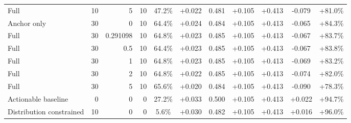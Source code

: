 \begin{table}[htbp]
\begin{tabular}{lrrrccccccc}
Full & 10 & 5 & 10 & 47.2\% & +0.022 & 0.481 & +0.105 & +0.413 & -0.079 & +81.0\% \\
Anchor only & 30 & 0 & 10 & 64.4\% & +0.024 & 0.484 & +0.105 & +0.413 & -0.065 & +84.3\% \\
Full & 30 & 0.291098 & 10 & 64.8\% & +0.023 & 0.485 & +0.105 & +0.413 & -0.067 & +83.7\% \\
Full & 30 & 0.5 & 10 & 64.4\% & +0.023 & 0.485 & +0.105 & +0.413 & -0.067 & +83.8\% \\
Full & 30 & 1 & 10 & 64.8\% & +0.023 & 0.485 & +0.105 & +0.413 & -0.069 & +83.2\% \\
Full & 30 & 2 & 10 & 64.8\% & +0.022 & 0.485 & +0.105 & +0.413 & -0.074 & +82.0\% \\
Full & 30 & 5 & 10 & 65.6\% & +0.020 & 0.484 & +0.105 & +0.413 & -0.090 & +78.3\% \\
Actionable baseline & 0 & 0 & 0 & 27.2\% & +0.033 & 0.500 & +0.105 & +0.413 & +0.022 & +94.7\% \\
Distribution constrained & 10 & 0 & 0 & 5.6\% & +0.030 & 0.482 & +0.105 & +0.413 & +0.016 & +96.0\% \\
\bottomrule
\end{tabular}
\end{table}